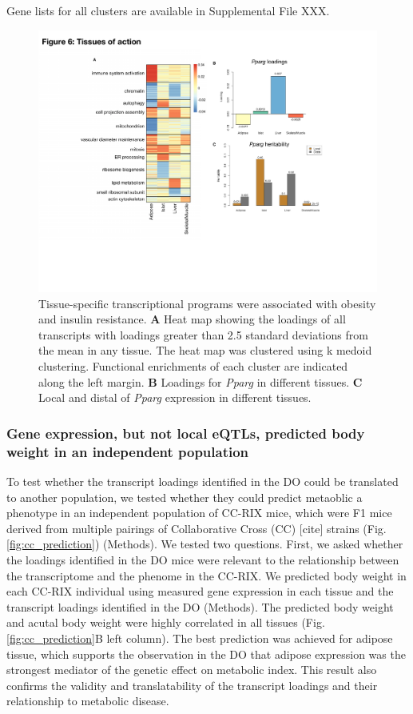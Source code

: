 \documentclass[
]{article}
\begin{document}
Gene lists for all clusters are available in Supplemental File XXX.

\begin{figure}[ht!]
\includegraphics[width=\textwidth]{Figures/Fig6_TOA.pdf} 
\caption{Tissue-specific transcriptional programs were associated 
with obesity and insulin resistance. \textbf{A} Heat map showing 
the loadings of all transcripts with loadings greater than 2.5 
standard deviations from the mean in any tissue. The heat map was 
clustered using k medoid clustering. Functional enrichments of each 
cluster are indicated along the left margin. \textbf{B} Loadings for 
\textit{Pparg} in different tissues. \textbf{C} Local and distal of 
\textit{Pparg} expression in different tissues.
}
\label{fig:toa}
\end{figure}

\subsubsection{Gene expression, but not local eQTLs, predicted body
weight in an independent
population}\label{gene-expression-but-not-local-eqtls-predicted-body-weight-in-an-independent-population}

To test whether the transcript loadings identified in the DO could be
translated to another population, we tested whether they could predict
metaoblic a phenotype in an independent population of CC-RIX mice, which
were F1 mice derived from multiple pairings of Collaborative Cross (CC)
{[}cite{]} strains (Fig. \ref{fig:cc_prediction}) (Methods). We tested
two questions. First, we asked whether the loadings identified in the DO
mice were relevant to the relationship between the transcriptome and the
phenome in the CC-RIX. We predicted body weight in each CC-RIX
individual using measured gene expression in each tissue and the
transcript loadings identified in the DO (Methods). The predicted body
weight and acutal body weight were highly correlated in all tissues
(Fig. \ref{fig:cc_prediction}B left column). The best prediction was
achieved for adipose tissue, which supports the observation in the DO
that adipose expression was the strongest mediator of the genetic effect
on metabolic index. This result also confirms the validity and
translatability of the transcript loadings and their relationship to
metabolic disease.
\end{document}
